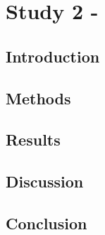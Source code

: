 \chapter{Study 2 - }
\label{label:S2}

\section{Introduction}
\label{label:S2_intro}

\section{Methods}
\label{label:S2_methods}

\section{Results}
\label{label:S2_results}

\section{Discussion}
\label{label:S2_discussion}

\section{Conclusion}
\label{label:S2_conclusion}